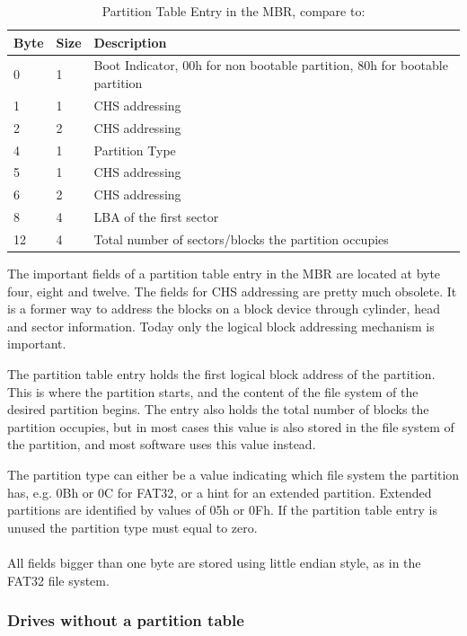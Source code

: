 \begin{table}[ht]
\caption{Partition Table Entry in the MBR, compare to: \cite{usb_ms_jan}}
\centering
\begin{tabular}{|l|l|l|}
\hline\hline
\textbf{Byte} & \textbf{Size} & \textbf{Description}\\ \hline
0 & 1 & Boot Indicator, 00h for non bootable partition, 80h for bootable partition \\ \hline
1 & 1 & CHS addressing \\ \hline
2 & 2 & CHS addressing \\ \hline
4 & 1 & Partition Type \\ \hline
5 & 1 & CHS addressing \\ \hline
6 & 2 & CHS addressing \\ \hline
8 & 4 & LBA of the first sector \\ \hline
12 & 4 & Total number of sectors/blocks the partition occupies \\ \hline
\end{tabular}
\label{table:mbr_entry}
\end{table}

The important fields of a partition table entry in the MBR are located at byte four, eight and twelve. The fields for CHS addressing are pretty much obsolete. It is a former way to address the blocks on a block device through cylinder, head and sector information. Today only the logical block addressing mechanism is important\cite{wiki_lba}.

The partition table entry holds the first logical block address of the partition. This is where the partition starts, and the content of the file system of the desired partition begins. The entry also holds the total number of blocks the partition occupies, but in most cases this value is also stored in the file system of the partition, and most software uses this value instead\cite{usb_ms_jan}.

The partition type can either be a value indicating which file system the partition has, e.g. 0Bh or 0C for FAT32, or a hint for an extended partition. Extended partitions are identified by values of 05h or 0Fh. If the partition table entry is unused the partition type must equal to zero\cite{usb_ms_jan}.
\\\\
All fields bigger than one byte are stored using little endian style, as in the FAT32 file system.

\subsubsection{Drives without a partition table}

